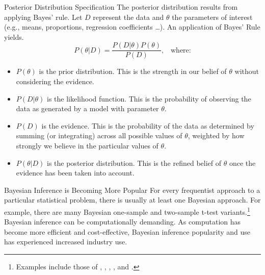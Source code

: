 \documentclass[pdf]{beamer}
\theoremstyle{remark}
\theoremstyle{definition}
\begin{document}
\begin{frame}[t]{Posterior Distribution Specification}
\small
The posterior distribution results from applying Bayes' rule.  Let $D$ represent the data and $\theta$ the parameters of interest (e.g., means, proportions, regression coefficients \ldots). An application of Bayes' Rule yields. \\
\vspace{0.0ex}
\begin{equation}
P(\theta|D) = \frac{P(D|\theta) P(\theta)}{P(D)}, \;\;\; \text{where:} 
\end{equation} 
\vspace{-1.5ex}
\begin{itemize}
 \item $P(\theta)$ is the prior distribution. This is the strength in our belief of $\theta$ without considering the evidence.
\item  $P(D|\theta)$ is the likelihood function. This is the probability of observing the data as generated by a model with parameter $\theta$.
\item $P(D)$ is the evidence. This is the probability of the data as determined by summing (or integrating) across all possible values of $\theta$, weighted by how strongly we believe in the particular values of $\theta$. 
\item $P(\theta|D)$ is the posterior distribution. This is the refined belief of $\theta$  once the evidence   has been taken into account.
\end{itemize}
\end{frame}

\begin{frame}[t]{Bayesian Inference is Becoming More Popular}
For every frequentist approach to a particular statistical problem, there is usually at least one Bayesian approach. For example, there are many Bayesian one-sample and two-sample t-test variants.\footnote{Examples include those of \cite{gonen2005}, \cite{wang2016}, \cite{abdelrazeq2020}, \cite{gronau2020}, and \cite{alLabadi2022}.} \\
\vspace{1.5ex}
Bayesian inference can be computationally demanding.  As computation has become more efficient and cost-effective, Bayesian inference popularity and use has experienced increased industry use.
\end{frame}
\end{document}
